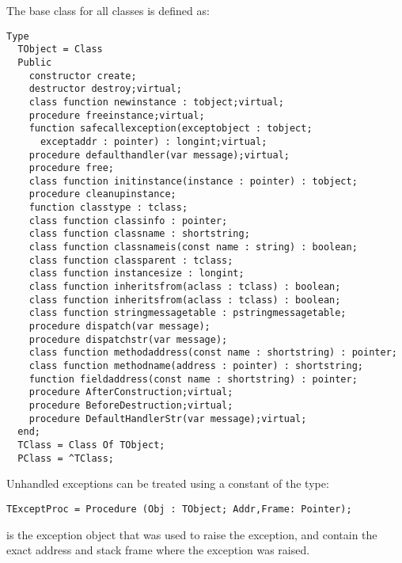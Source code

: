 \documentclass{report}
\begin{document}
The base class for all classes is defined as:
\begin{verbatim}
Type
  TObject = Class 
  Public
    constructor create;
    destructor destroy;virtual;
    class function newinstance : tobject;virtual;
    procedure freeinstance;virtual;
    function safecallexception(exceptobject : tobject;
      exceptaddr : pointer) : longint;virtual;
    procedure defaulthandler(var message);virtual;
    procedure free;
    class function initinstance(instance : pointer) : tobject;
    procedure cleanupinstance;
    function classtype : tclass;
    class function classinfo : pointer;
    class function classname : shortstring;
    class function classnameis(const name : string) : boolean;
    class function classparent : tclass;
    class function instancesize : longint;
    class function inheritsfrom(aclass : tclass) : boolean;
    class function inheritsfrom(aclass : tclass) : boolean;
    class function stringmessagetable : pstringmessagetable;
    procedure dispatch(var message);
    procedure dispatchstr(var message);
    class function methodaddress(const name : shortstring) : pointer;
    class function methodname(address : pointer) : shortstring;
    function fieldaddress(const name : shortstring) : pointer; 
    procedure AfterConstruction;virtual;
    procedure BeforeDestruction;virtual;
    procedure DefaultHandlerStr(var message);virtual;
  end;
  TClass = Class Of TObject;
  PClass = ^TClass;
\end{verbatim}
Unhandled exceptions can be treated using a constant of the 
 type:
\begin{verbatim}
TExceptProc = Procedure (Obj : TObject; Addr,Frame: Pointer);
\end{verbatim}
 is the exception object that was used to raise the exception,
 and  contain the exact address and stack frame 
where the exception was raised.
\end{document}
